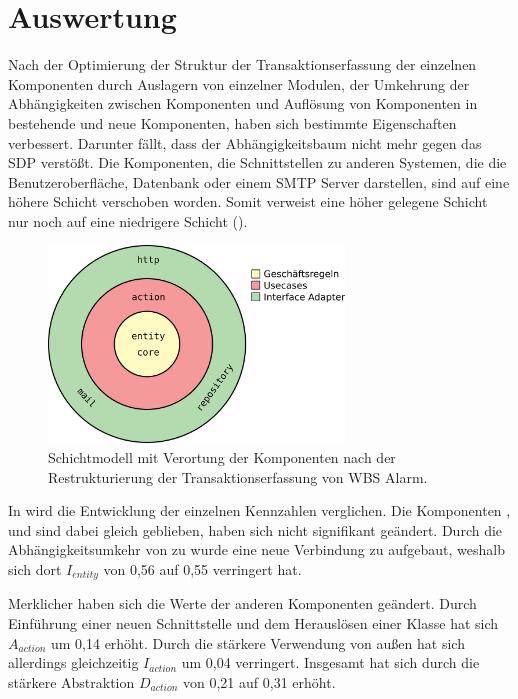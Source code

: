 \chapter{Auswertung}
\label{ch:Auswertung}

Nach der Optimierung der Struktur der Transaktionserfassung \bzgl der einzelnen Komponenten durch Auslagern von einzelner Modulen, der Umkehrung der Abhängigkeiten zwischen Komponenten und Auflösung von Komponenten in bestehende und neue Komponenten, haben sich bestimmte Eigenschaften verbessert. Darunter fällt, dass der Abhängigkeitsbaum nicht mehr gegen das \ac{SDP} verstößt. Die Komponenten, die Schnittstellen zu anderen Systemen, die die Benutzeroberfläche, Datenbank oder einem SMTP Server darstellen, sind auf eine höhere Schicht verschoben worden. Somit verweist eine höher gelegene Schicht nur noch auf eine niedrigere Schicht (). 

\begin{figure}
  \centering
  \includegraphics[width=0.7\textwidth]{res/schichten.jpg}
   \caption{Schichtmodell mit Verortung der Komponenten nach der Restrukturierung der Transaktionserfassung von WBS Alarm.}
   \label{fig:schichten}
\end{figure}

In  wird die Entwicklung der einzelnen Kennzahlen verglichen. Die Komponenten ,  und  sind dabei gleich geblieben, \bzw haben sich nicht signifikant geändert. Durch die Abhängigkeitsumkehr von  zu  wurde eine neue Verbindung zu  aufgebaut, weshalb sich dort $I_{entity}$ von 0,56 auf 0,55 verringert hat.

Merklicher haben sich die Werte der anderen Komponenten geändert. Durch Einführung einer neuen Schnittstelle und dem Herauslösen einer Klasse hat sich $A_{action}$ um 0,14 erhöht. Durch die stärkere Verwendung von außen hat sich allerdings gleichzeitig $I_{action}$ um 0,04 verringert. Insgesamt hat sich durch die stärkere Abstraktion $D_{action}$ von 0,21 auf 0,31 erhöht.

